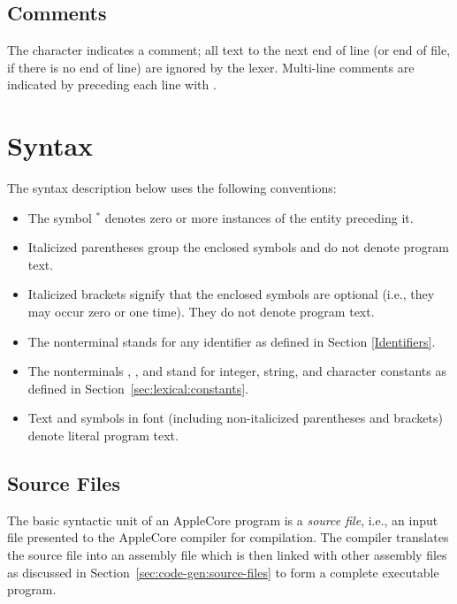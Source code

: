 \documentclass[10pt]{article}
\begin{document}
\subsection{Comments}
\label{sec:lexical:comments}

The character \kwd{\#} indicates a comment; all text to the next end
of line (or end of file, if there is no end of line) are ignored by
the lexer.  Multi-line comments are indicated by preceding each line
with \kwd{\#}.

\section{Syntax}
\label{sec:syntax}

The syntax description below uses the following conventions:
%
\begin{itemize}
%
\item The symbol $^*$ denotes zero or more instances of the entity
  preceding it.
%
\item Italicized parentheses \group{} group the enclosed symbols and
  do not denote program text.
%
\item Italicized brackets \opt{} signify that the enclosed symbols are
  optional (i.e., they may occur zero or one time).  They do not
  denote program text.
%
\item The nonterminal  stands for any identifier
  as defined in Section \ref{Identifiers}.
%
\item The nonterminals ,
  , and  stand for integer,
  string, and character constants as defined in
  Section~\ref{sec:lexical:constants}.
%
\item Text and symbols in  font (including
  non-italicized parentheses and brackets) denote literal program
  text.
%
\end{itemize}

\subsection{Source Files}
\label{sec:syntax:source-files}

The basic syntactic unit of an AppleCore program is a \emph{source
  file}, i.e., an input file presented to the AppleCore compiler for
compilation.  The compiler translates the source file into an assembly
file which is then linked with other assembly files as discussed in
Section~\ref{sec:code-gen:source-files} to form a complete executable
program.
\end{document}
